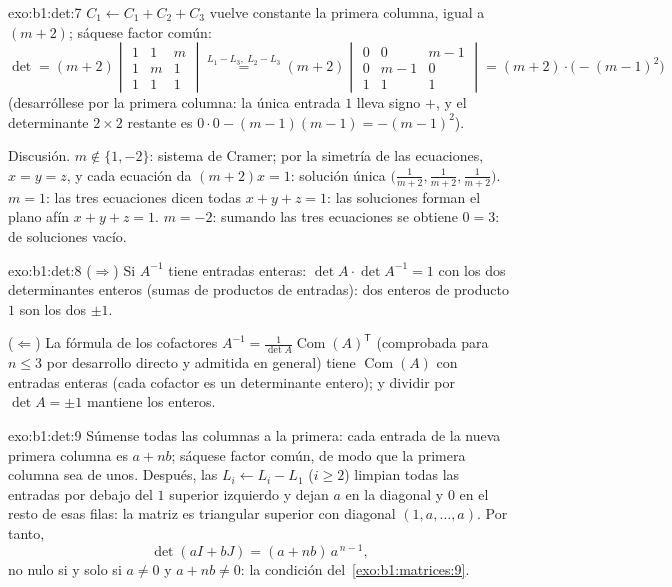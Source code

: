 \begin{solution}{exo:b1:det:7}
$C_1 \leftarrow C_1 + C_2 + C_3$ vuelve constante la primera columna,
igual a $(m+2)$; sáquese factor común:
\[
\det = (m+2)\begin{vmatrix}
1 & 1 & m\\ 1 & m & 1\\ 1 & 1 & 1
\end{vmatrix}
\overset{L_1 - L_3,\ L_2 - L_3}{=}
(m+2)\begin{vmatrix}
0 & 0 & m-1\\ 0 & m-1 & 0\\ 1 & 1 & 1
\end{vmatrix}
= (m+2)\cdot\bigl(-(m-1)^2\bigr)
\]
(desarróllese por la primera columna: la única entrada $1$ lleva
signo $+$, y el determinante $2 \times 2$ restante es
$0 \cdot 0 - (m-1)(m-1) = -(m-1)^2$).

Discusión. $m \notin \{1, -2\}$: sistema de Cramer; por la simetría
de las ecuaciones, $x = y = z$, y cada ecuación da $(m + 2)x = 1$:
solución única
$\bigl(\frac{1}{m+2}, \frac{1}{m+2}, \frac{1}{m+2}\bigr)$. $m = 1$:
las tres ecuaciones dicen todas $x + y + z = 1$: las soluciones
forman el plano afín $x + y + z = 1$. $m = -2$: sumando las tres
ecuaciones se obtiene $0 = 3$:  de soluciones vacío.
\end{solution}

\begin{solution}{exo:b1:det:8}
($\Rightarrow$) Si $A^{-1}$ tiene entradas enteras:
$\det A \cdot \det A^{-1} = 1$ con los dos determinantes enteros
(sumas de productos de entradas): dos enteros de producto $1$ son
los dos $\pm1$.

($\Leftarrow$) La fórmula de los cofactores
$A^{-1} = \frac{1}{\det A}\operatorname{Com}(A)^{\mathsf T}$
(comprobada para $n \leq 3$ por desarrollo directo y admitida en
general) tiene $\operatorname{Com}(A)$ con entradas enteras (cada
cofactor es un determinante entero); y dividir por
$\det A = \pm 1$ mantiene los enteros.
\end{solution}

\begin{solution}{exo:b1:det:9}
Súmense todas las columnas a la primera: cada entrada de la nueva
primera columna es $a + nb$; sáquese factor común, de modo que la
primera columna sea de unos. Después, las 
$L_i \leftarrow L_i - L_1$ ($i \geq 2$) limpian todas las entradas
por debajo del $1$ superior izquierdo y dejan $a$ en la diagonal y
$0$ en el resto de esas filas: la matriz es triangular superior con
diagonal $(1, a, \dots, a)$. Por tanto,
\[
\det(aI + bJ) = (a + nb)\, a^{\,n-1} ,
\]
no nulo si y solo si $a \neq 0$ y $a + nb \neq 0$: la condición
del~\cref{exo:b1:matrices:9}.
\end{solution}

